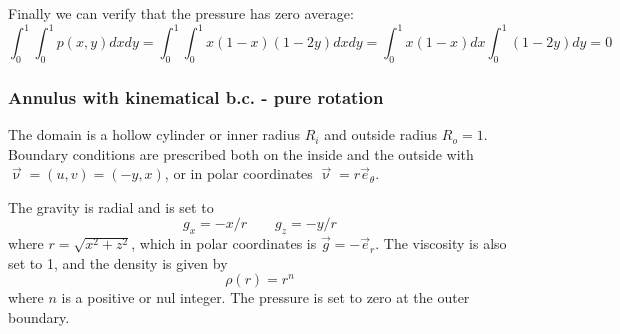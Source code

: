 Finally we can verify that the pressure has zero average:
\[
\int_0^1 \int_0^1 p(x,y) dx dy = 
\int_0^1 \int_0^1  x(1-x)(1-2y) dxdy= 
\int_0^1  x(1-x) dx \int_0^1  (1-2y) dy=0 
\]


\subsubsection{Annulus with kinematical b.c. - pure rotation} \label{ss:ankbc}

The domain is a hollow cylinder or inner radius $R_{i}$ and outside radius $R_{o}=1$.
Boundary conditions are prescribed both on the inside and the outside with 
${\vec \upnu}=(u,v)=(-y,x)$, or in 
polar coordinates ${\vec \upnu}=r {\vec e}_\theta$.

The gravity is radial and is set to
\[
g_x=-x/r  \quad\quad g_z=-y/r
\]
where $r=\sqrt{x^2+z^2}$, which in polar coordinates is ${\vec g}=-{\vec e}_r$.
The viscosity is also set to 1, and the density is given by
\[
\rho(r)=r^n
\]
where $n$ is a positive or nul integer. The pressure is set to zero at the outer boundary.

